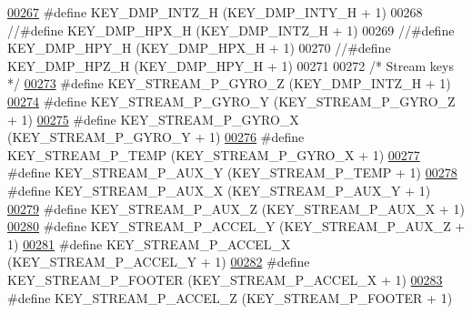 \begin{DoxyCode}
\hypertarget{dmp_key_8h_source.tex_l00267}{}\hyperlink{dmp_key_8h_a6f915c26c147edce87bc035c93f2eff0}{00267} \textcolor{preprocessor}{#define KEY\_DMP\_INTZ\_H              (KEY\_DMP\_INTY\_H + 1)}
00268 \textcolor{comment}{//#define KEY\_DMP\_HPX\_H               (KEY\_DMP\_INTZ\_H + 1)}
00269 \textcolor{comment}{//#define KEY\_DMP\_HPY\_H               (KEY\_DMP\_HPX\_H + 1)}
00270 \textcolor{comment}{//#define KEY\_DMP\_HPZ\_H               (KEY\_DMP\_HPY\_H + 1)}
00271 
00272 \textcolor{comment}{/* Stream keys */}
\hypertarget{dmp_key_8h_source.tex_l00273}{}\hyperlink{dmp_key_8h_aa5d4b294e70011d67eb69fac5fd25a2b}{00273} \textcolor{preprocessor}{#define KEY\_STREAM\_P\_GYRO\_Z         (KEY\_DMP\_INTZ\_H + 1)}
\hypertarget{dmp_key_8h_source.tex_l00274}{}\hyperlink{dmp_key_8h_a5fa600da02cc72043e861e7ce367883f}{00274} \textcolor{preprocessor}{#define KEY\_STREAM\_P\_GYRO\_Y         (KEY\_STREAM\_P\_GYRO\_Z + 1)}
\hypertarget{dmp_key_8h_source.tex_l00275}{}\hyperlink{dmp_key_8h_a57050efd179f73b7cbd39acfda55aaa9}{00275} \textcolor{preprocessor}{#define KEY\_STREAM\_P\_GYRO\_X         (KEY\_STREAM\_P\_GYRO\_Y + 1)}
\hypertarget{dmp_key_8h_source.tex_l00276}{}\hyperlink{dmp_key_8h_a8165ecdca80347f0afcc058a0328eb26}{00276} \textcolor{preprocessor}{#define KEY\_STREAM\_P\_TEMP           (KEY\_STREAM\_P\_GYRO\_X + 1)}
\hypertarget{dmp_key_8h_source.tex_l00277}{}\hyperlink{dmp_key_8h_a19282ce8b2d02687eef36c9d9b94fa96}{00277} \textcolor{preprocessor}{#define KEY\_STREAM\_P\_AUX\_Y          (KEY\_STREAM\_P\_TEMP + 1)}
\hypertarget{dmp_key_8h_source.tex_l00278}{}\hyperlink{dmp_key_8h_a905a8b6b6a702a439eec4793921d6338}{00278} \textcolor{preprocessor}{#define KEY\_STREAM\_P\_AUX\_X          (KEY\_STREAM\_P\_AUX\_Y + 1)}
\hypertarget{dmp_key_8h_source.tex_l00279}{}\hyperlink{dmp_key_8h_a49e10328ac2c75c11481933baff54862}{00279} \textcolor{preprocessor}{#define KEY\_STREAM\_P\_AUX\_Z          (KEY\_STREAM\_P\_AUX\_X + 1)}
\hypertarget{dmp_key_8h_source.tex_l00280}{}\hyperlink{dmp_key_8h_ad942f069622a953edc04409b54ace78b}{00280} \textcolor{preprocessor}{#define KEY\_STREAM\_P\_ACCEL\_Y        (KEY\_STREAM\_P\_AUX\_Z + 1)}
\hypertarget{dmp_key_8h_source.tex_l00281}{}\hyperlink{dmp_key_8h_a9f8de22e915f162ee9b32468c6435612}{00281} \textcolor{preprocessor}{#define KEY\_STREAM\_P\_ACCEL\_X        (KEY\_STREAM\_P\_ACCEL\_Y + 1)}
\hypertarget{dmp_key_8h_source.tex_l00282}{}\hyperlink{dmp_key_8h_a28c1f50101e38f495f9faf15412b7535}{00282} \textcolor{preprocessor}{#define KEY\_STREAM\_P\_FOOTER         (KEY\_STREAM\_P\_ACCEL\_X + 1)}
\hypertarget{dmp_key_8h_source.tex_l00283}{}\hyperlink{dmp_key_8h_a56b9da368656d668ea4c453f74d0d92f}{00283} \textcolor{preprocessor}{#define KEY\_STREAM\_P\_ACCEL\_Z        (KEY\_STREAM\_P\_FOOTER + 1)}

\end{DoxyCode}
